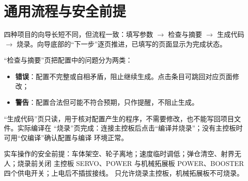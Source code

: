\section{通用流程与安全前提}

四种项目的向导长短不同，但流程一致：填写参数 $\rightarrow$ 检查与摘要 $\rightarrow$
生成代码 $\rightarrow$ 烧录。向导底部的“下一步”逐页推进，已填写的页面显示为完成状态。

“检查与摘要”页把配置中的问题分为两类：

\begin{itemize}
  \item \textbf{错误}：配置不完整或自相矛盾，阻止继续生成。点击条目可跳回对应页面修改；
  \item \textbf{警告}：配置合法但可能不符合预期，只作提醒，不阻止生成。
\end{itemize}

“生成代码”页只读，用于核对配置产生的程序，不需要修改，也不能写回项目文件。实际编译在
“烧录”页完成：连接主控板后点击“编译并烧录”；没有主控板时可用“仅编译”确认配置与编译
环境正常。

\begin{note}
实车操作的安全前提：车体架空、轮子离地；速度临时调低；弹仓清空、射界无人；烧录前关闭
主控板 SERVO、POWER 与机械拓展板 POWER、BOOSTER 四个供电开关；上电后不插拔接线。
只允许烧录主控板，机械拓展板不可烧录。
\end{note}
